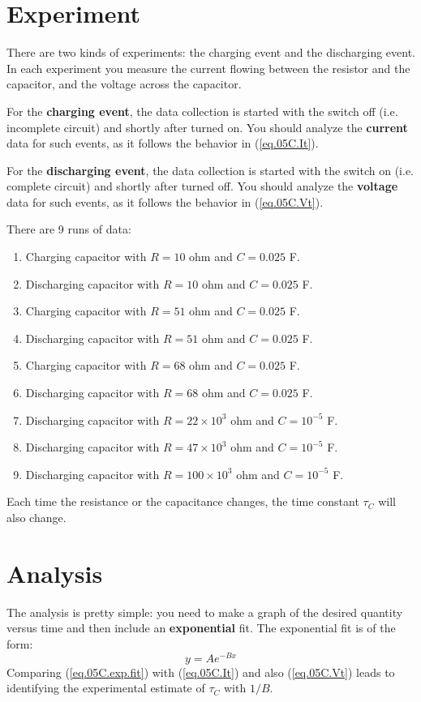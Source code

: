 \section{Experiment}
There are two kinds of experiments: the charging event and the discharging event. In each experiment you measure the current flowing between the resistor and the capacitor, and the voltage across the capacitor.

For the \textbf{charging event}, the data collection is started with the switch off (i.e. incomplete circuit) and shortly after turned on. You should analyze the \textbf{current} data for such events, as it follows the behavior in (\ref{eq.05C.It}).

For the \textbf{discharging event}, the data collection is started with the switch on (i.e. complete circuit) and shortly after turned off. You should analyze the \textbf{voltage} data for such events, as it follows the behavior in (\ref{eq.05C.Vt}).

There are 9 runs of data:
\begin{enumerate}
	\item Charging capacitor with $R = 10$ ohm and $C = 0.025$ F.
	\item Discharging capacitor with $R = 10$ ohm and $C = 0.025$ F.
	\item Charging capacitor with $R = 51$ ohm and $C = 0.025$ F.
	\item Discharging capacitor with $R = 51$ ohm and $C = 0.025$ F.
	\item Charging capacitor with $R = 68$ ohm and $C = 0.025$ F.
	\item Discharging capacitor with $R = 68$ ohm and $C = 0.025$ F.
	\item Discharging capacitor with $R = 22 \times 10^{3}$ ohm and $C = 10^{-5}$ F.
	\item Discharging capacitor with $R = 47 \times 10^{3}$ ohm and $C = 10^{-5}$ F.
	\item Discharging capacitor with $R = 100 \times 10^{3}$ ohm and $C = 10^{-5}$ F.
\end{enumerate}
Each time the resistance or the capacitance changes, the time constant $\tau_{C}$ will also change.
\section{Analysis}
The analysis is pretty simple: you need to make a graph of the desired quantity versus time and then include an \textbf{exponential} fit. The exponential fit is of the form:
\begin{equation}
	y = A e^{-Bx}
	\label{eq.05C.exp.fit}
\end{equation}
Comparing (\ref{eq.05C.exp.fit}) with (\ref{eq.05C.It}) and also (\ref{eq.05C.Vt}) leads to identifying the experimental estimate of $\tau_{C}$ with $1 / B$.


